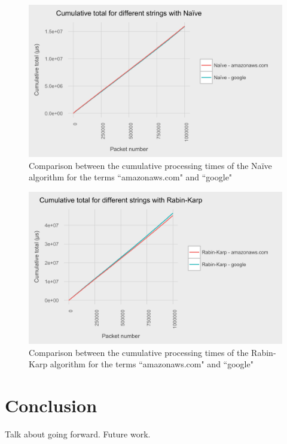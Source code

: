 \documentclass{article}
\begin{document}
\begin{figure}[h!bt]
  \centering
  \includegraphics[width=\textwidth]{graphs/term_length_compare-naive.png}
  \caption{Comparison between the cumulative processing times of the Na{\"i}ve algorithm for the terms ``amazonaws.com" and ``google"}
\end{figure}

\begin{figure}[h!bt]
  \centering
  \includegraphics[width=\textwidth]{graphs/term_length_compare-rabin-karp.png}
  \caption{Comparison between the cumulative processing times of the Rabin-Karp algorithm for the terms ``amazonaws.com" and ``google"}
\end{figure}

\section{Conclusion}
Talk about going forward. Future work.
\nocite{*}




\end{document}
